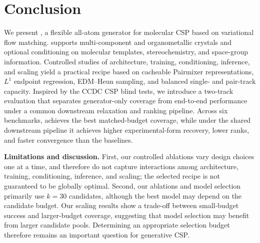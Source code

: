 \section{Conclusion}

We present \model{}, a flexible all-atom generator for molecular CSP based on
variational flow matching. \model{} supports multi-component and organometallic
crystals and optional conditioning on molecular templates, stereochemistry, and
space-group information. Controlled studies of architecture, training,
conditioning, inference, and scaling yield a practical recipe based on cacheable
Pairmixer representations, $L^1$ endpoint regression, EDM--Heun sampling, and
balanced single- and pair-track capacity. Inspired by the CCDC CSP blind tests, we introduce a two-track evaluation that separates generator-only coverage from end-to-end performance under a common downstream relaxation and ranking pipeline. Across six benchmarks, \model{} achieves the best matched-budget
coverage, while under the shared downstream pipeline it achieves higher
experimental-form recovery, lower ranks, and faster convergence than the baselines.

\textbf{Limitations and discussion.}
First, our controlled ablations vary design choices one at a time, 
and therefore do not capture interactions among architecture, training,
conditioning, inference, and scaling; the selected recipe is not guaranteed to be
globally optimal. Second, our ablations and model selection primarily use
$k{=}30$ candidates, although the best model may depend on the candidate budget.
Our scaling results show a trade-off between small-budget success and larger-budget
coverage, suggesting that model selection may benefit from larger candidate pools.
Determining an appropriate selection budget therefore remains an important
question for generative CSP.
